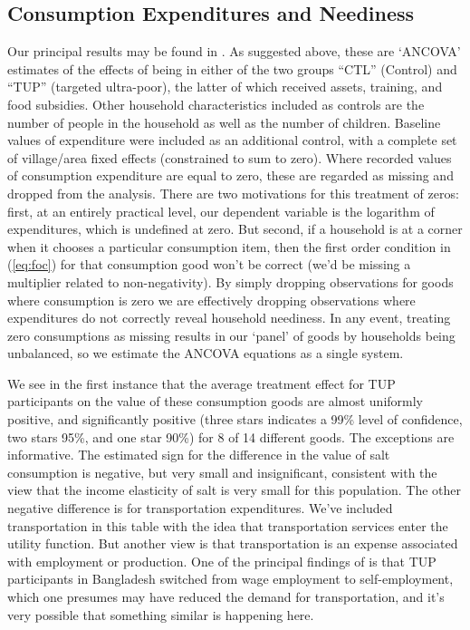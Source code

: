 \documentclass[11pt]{article}
\newcommand{\Eq}[1]{(\ref{eq:#1})}
\begin{document}
\subsection*{Consumption Expenditures and Neediness}
\label{sec-6-1}

Our principal results may be found in .  As
suggested above, these are `ANCOVA' estimates of the effects of being
in either of the two groups ``CTL'' (Control) and ``TUP'' (targeted
ultra-poor), the latter of which received assets, training, and food
subsidies.  Other household characteristics included as controls
are the number of people in the household as well as the number of
children.  Baseline values of expenditure were included as an
additional control, with a complete set of village/area fixed effects
(constrained to sum to zero).  Where recorded values of consumption
expenditure are equal to zero, these are regarded as missing and
dropped from the analysis.  There are two motivations for this
treatment of zeros: first, at an entirely practical level, our
dependent variable is the logarithm of expenditures, which is
undefined at zero.  But second, if a household is at a corner when it
chooses a particular consumption item, then the first order condition
in \Eq{foc} for that consumption good won't be correct (we'd be
missing a multiplier related to non-negativity).  By simply dropping
observations for goods where consumption is zero we are effectively
dropping observations where expenditures do not correctly reveal
household neediness.  In any event, treating zero consumptions as
missing results in our `panel' of goods by households being
unbalanced, so we estimate the ANCOVA equations as a single system.

We see in the first instance that the average treatment effect for TUP
participants on the value of these consumption goods are almost
uniformly positive, and significantly positive (three stars indicates
a 99\% level of confidence, two stars 95\%, and one star 90\%) for 8 of
14 different goods.  The exceptions are informative.  The estimated
sign for the difference in the value of salt consumption is negative,
but very small and insignificant, consistent with the view that the
income elasticity of salt is very small for this population.  The
other negative difference is for transportation expenditures.  We've
included transportation in this table with the idea that
transportation services enter the utility function.  But another view
is that transportation is an expense associated with employment or
production.  One of the principal findings of \cite{bandiera2017}
is that TUP participants in Bangladesh switched from wage employment
to self-employment, which one presumes may have reduced the demand for
transportation, and it's very possible that something similar is
happening here.
\end{document}
